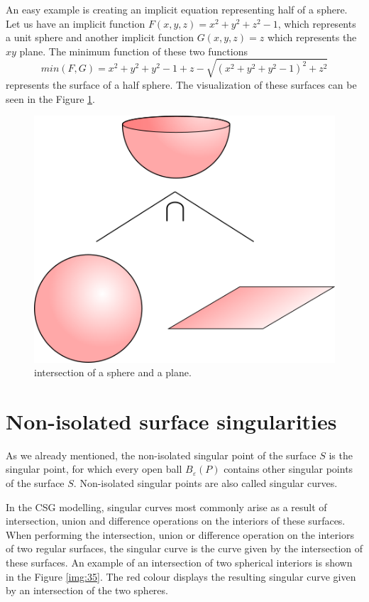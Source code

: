 An easy example is creating an implicit equation representing half of
a sphere. Let us have an implicit function 
$F(x, y, z) = x^2+y^2+z^2-1$, which represents a unit sphere and another
implicit function $G(x, y, z) = z$ which represents the $xy$ plane.
The minimum function of these two functions
$$min(F, G) = x^2+y^2+y^2-1+z-\sqrt{(x^2+y^2+y^2-1)^2+z^2}$$ represents the
surface of a half sphere. The visualization of these surfaces can be seen in
the Figure \ref{img:20}.
\begin{figure}
    \centerline{\includegraphics[scale=0.5]{images/img20}}
    \caption[Intersection of a sphere and a plane]
    {intersection of a sphere and a plane.}
    \label{img:20}
\end{figure}


\section{Non-isolated surface singularities}
\label{sub2.3}

As we already mentioned, the non-isolated singular point of the surface $S$ is 
the singular point, for which
every open ball $B_\varepsilon(P)$ contains other singular points of the surface $S$.
Non-isolated singular points are also called singular curves.

In the CSG modelling, singular curves most commonly arise as a result of intersection,
union and difference operations on the interiors of these surfaces. When performing
the intersection, union or difference operation on the interiors of two regular surfaces, 
the singular curve is the curve given by the intersection of these surfaces. An example
of an intersection of two spherical interiors is shown in the Figure \ref{img:35}. The red colour displays the resulting singular curve given by an intersection of the two spheres.

